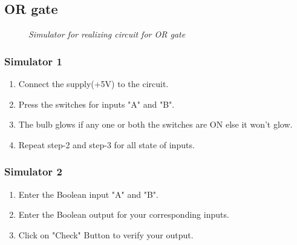 	\subsection{OR gate}
		\begin{figure}[ht]
			\centering 
			\hfill
			\caption{\textit{Simulator for realizing circuit for OR gate}}
		\end{figure}
		\subsubsection{Simulator 1}
			\begin{enumerate}
				\tightlist
				\item Connect the supply(+5V) to the circuit.
				\item Press the switches for inputs "A" and "B".			
				\item The bulb glows if any one or both the switches are ON else it won't glow.
				\item Repeat step-2 and step-3 for all state of inputs.
			\end{enumerate}
		\subsubsection{Simulator 2}
			\begin{enumerate}
				\tightlist
				\item Enter the Boolean input "A" and "B".
				\item Enter the Boolean output for your corresponding inputs.
				\item Click on "Check" Button to verify your output.			
			\end{enumerate}

